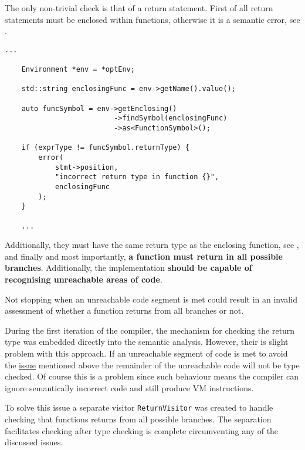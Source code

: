 The only non-trivial check is that of a return statement. First
of all return statements must be enclosed within functions,
otherwise it is a semantic error, see
.

\begin{lstlisting}[caption={Checking whether the return
expression has the same type as the function return type in the
\texttt{visit(ReturnStmt *)} method in the
\texttt{AnalysisVisitor} class
(analysis/AnalysisVisitor.cpp)},label=lst:returntype]
    ...

    Environment *env = *optEnv;

    std::string enclosingFunc = env->getName().value();

    auto funcSymbol = env->getEnclosing()
                          ->findSymbol(enclosingFunc)
                          ->as<FunctionSymbol>();

    if (exprType != funcSymbol.returnType) {
        error(
            stmt->position,
            "incorrect return type in function {}",
            enclosingFunc
        );
    }

    ...
\end{lstlisting}

Additionally, they must have the same return type as the
enclosing function, see , and finally and
most importantly, \textbf{a function must return in all possible
branches}. Additionally, the implementation \textbf{should be
capable of recognising unreachable areas of code}.

\begin{marker}
\label{sss:returnissue} Not stopping when an unreachable code
segment is met could result in an invalid assessment of whether
a function returns from all branches or not.
\end{marker}

During the first iteration of the compiler, the mechanism for
checking the return type was embedded directly into the semantic
analysis. However, their is slight problem with this approach.
If an unreachable segment of code is met to avoid the
\hyperref[sss:returnissue]{issue} mentioned above the remainder
of the unreachable code will not be type checked. Of course this
is a problem since such behaviour means the compiler can ignore
semantically incorrect code and still produce VM instructions.

To solve this issue a separate visitor \texttt{ReturnVisitor}
was created to handle checking that functions returns from all
possible branches. The separation facilitates checking after
type checking is complete circumventing any of the discussed
issues.

